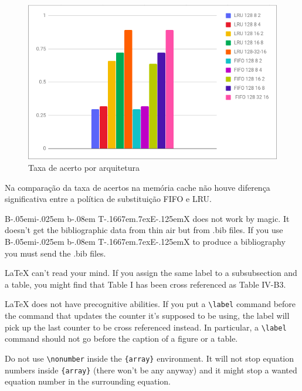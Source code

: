 \documentclass[conference]{IEEEtran}
\def\BibTeX{{\rm B\kern-.05em{\sc i\kern-.025em b}\kern-.08em
    T\kern-.1667em\lower.7ex\hbox{E}\kern-.125emX}}
\begin{document}
\begin{figure}
    \centering
    \includegraphics[width=\linewidth]{Imagens/HIT RATE POR ARQUITETURA.png}
    \caption{Taxa de acerto por arquitetura}
    \label{fig:Taxa de acerto por arquitetura}
\end{figure}

Na comparação da taxa de acertos na memória cache não houve diferença significativa entre a política de substituição FIFO e LRU.




{\BibTeX} does not work by magic. It doesn't get the bibliographic
data from thin air but from .bib files. If you use {\BibTeX} to produce a
bibliography you must send the .bib files. 

{\LaTeX} can't read your mind. If you assign the same label to a
subsubsection and a table, you might find that Table I has been cross
referenced as Table IV-B3. 

{\LaTeX} does not have precognitive abilities. If you put a
\verb|\label| command before the command that updates the counter it's
supposed to be using, the label will pick up the last counter to be
cross referenced instead. In particular, a \verb|\label| command
should not go before the caption of a figure or a table.

Do not use \verb|\nonumber| inside the \verb|{array}| environment. It
will not stop equation numbers inside \verb|{array}| (there won't be
any anyway) and it might stop a wanted equation number in the
surrounding equation.
\end{document}
